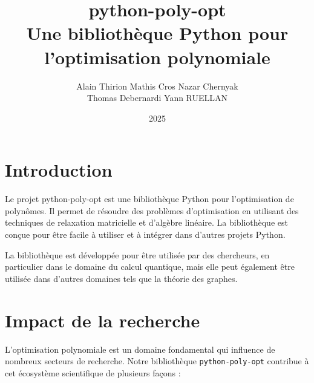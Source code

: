 \documentclass[12pt,a4paper]{article}
\title{
  \textbf{python-poly-opt} \\
  \large{Une bibliothèque Python pour l'optimisation polynomiale}
}
\author{
    Alain Thirion \quad
    Mathis Cros \quad
    Nazar Chernyak \\
    Thomas Debernardi \quad
    Yann RUELLAN
}
\date{2025}
\begin{document}
\maketitle


\section{Introduction}


Le projet python-poly-opt est une bibliothèque Python pour l'optimisation de polynômes. Il permet de résoudre des problèmes d'optimisation en utilisant des techniques de relaxation matricielle et d'algèbre linéaire. La bibliothèque est conçue pour être facile à utiliser et à intégrer dans d'autres projets Python.

La bibliothèque est développée pour être utilisée par des chercheurs, en particulier dans le domaine du calcul quantique, mais elle peut également être utilisée dans d'autres domaines tels que la théorie des graphes. 

\section{Impact de la recherche}

L'optimisation polynomiale est un domaine fondamental qui influence de nombreux secteurs de recherche. Notre bibliothèque \texttt{python-poly-opt} contribue à cet écosystème scientifique de plusieurs façons :
\end{document}
